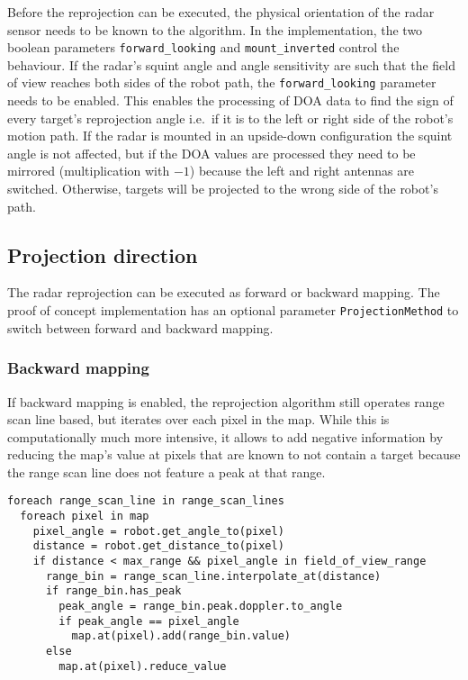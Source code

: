 Before the reprojection can be executed, the physical orientation of the
radar sensor needs to be known to the algorithm. In the implementation,
the two boolean parameters \texttt{forward\_looking} and
\texttt{mount\_inverted} control the behaviour. If the radar's squint
angle and angle sensitivity are such that the field of view reaches both
sides of the robot path, the \texttt{forward\_looking} parameter needs
to be enabled. This enables the processing of DOA data to find the sign
of every target's reprojection angle i.e.~if it is to the left or right
side of the robot's motion path. If the radar is mounted in an
upside-down configuration the squint angle is not affected, but if the
DOA values are processed they need to be mirrored (multiplication with
\(-1\)) because the left and right antennas are switched. Otherwise,
targets will be projected to the wrong side of the robot's path.

\subsection{Projection direction}\label{projection-direction}

The radar reprojection can be executed as forward or backward mapping.
The proof of concept implementation has an optional parameter
\texttt{ProjectionMethod} to switch between forward and backward
mapping.

\subsubsection{Backward mapping}\label{backward-mapping}

If backward mapping is enabled, the reprojection algorithm still
operates range scan line based, but iterates over each pixel in the map.
While this is computationally much more intensive, it allows to add
negative information by reducing the map's value at pixels that are
known to not contain a target because the range scan line does not
feature a peak at that range.

\begin{verbatim}
foreach range_scan_line in range_scan_lines
  foreach pixel in map
    pixel_angle = robot.get_angle_to(pixel)
    distance = robot.get_distance_to(pixel)
    if distance < max_range && pixel_angle in field_of_view_range
      range_bin = range_scan_line.interpolate_at(distance)
      if range_bin.has_peak
        peak_angle = range_bin.peak.doppler.to_angle
        if peak_angle == pixel_angle
          map.at(pixel).add(range_bin.value)
      else
        map.at(pixel).reduce_value
\end{verbatim}

